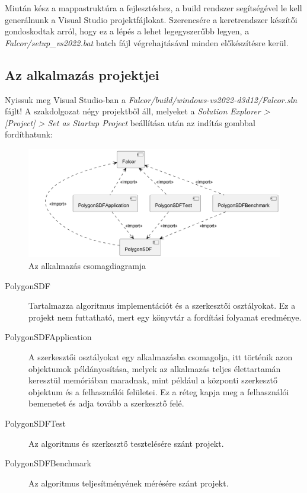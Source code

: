 Miután kész a mappastruktúra a fejlesztéshez, a build rendszer segítségével le kell generálnunk a Visual Studio projektfájlokat. Szerencsére a keretrendszer készítői gondoskodtak arról, hogy ez a lépés a lehet legegyszerűbb legyen, a \textit{Falcor/setup\_vs2022.bat} batch fájl végrehajtásával minden előkészítésre kerül.


\subsection{Az alkalmazás projektjei}

Nyissuk meg Visual Studio-ban a \textit{Falcor/build/windows-vs2022-d3d12/Falcor.sln} fájlt! A szakdolgozat négy projektből áll, melyeket a \textit{Solution Explorer > [Project] > Set as Startup Project} beállítása után az indítás gombbal fordíthatunk:

\begin{figure}[H]
    \centering
    \includegraphics[width=1\linewidth]{images/component_project.png}
    \caption{Az alkalmazás csomagdiagramja}
    \label{fig:component_project-1}
\end{figure}

\begin{description}
    \item[PolygonSDF] Tartalmazza algoritmus implementációt és a szerkesztői osztályokat. Ez a projekt nem futtatható, mert egy könyvtár a fordítási folyamat eredménye.
    \item[PolygonSDFApplication] A szerkesztői osztályokat egy alkalmazásba csomagolja, itt történik azon objektumok példányosítása, melyek az alkalmazás teljes élettartamán keresztül memóriában maradnak, mint például a központi szerkesztő objektum és a felhasználói felületei. Ez a réteg  kapja meg a felhasználói bemenetet és adja tovább a szerkesztő felé.
    \item[PolygonSDFTest] Az algoritmus és szerkesztő tesztelésére szánt projekt.
    \item[PolygonSDFBenchmark] Az algoritmus teljesítményének mérésére szánt projekt.
\end{description}


